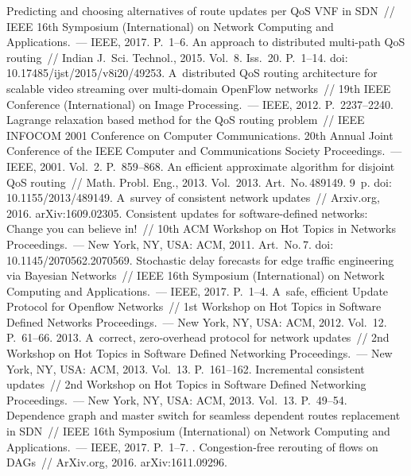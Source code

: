 \begin{multicols}{2}
{{\begin{thebibliography}{99}
 
 Predicting and choosing alternatives 
of route updates per QoS VNF in SDN~// IEEE 16th Symposium (International)
on Network Computing and Applications.~--- IEEE, 2017. P.~1--6.
 An approach to distributed multi-path QoS routing~// 
Indian J.~Sci. Technol., 2015. Vol.~8. Iss.~20. P.~1--14. 
doi: 10.17485/ijst/2015/v8i20/49253.
A~distributed QoS routing architecture for scalable video streaming over multi-domain 
OpenFlow networks~// 19th IEEE Conference (International)
on Image Processing.~--- IEEE, 2012. P.~2237--2240.
Lagrange relaxation based method for the QoS routing problem~// 
IEEE INFOCOM 2001 Conference on Computer Communications. 20th 
Annual Joint Conference of the IEEE Computer and Communications Society
Proceedings.~--- IEEE, 2001. Vol.~2. P.~859--868.
An efficient approximate algorithm for disjoint QoS routing~// 
Math. Probl. Eng., 2013. Vol.~2013. Art.\ No.\,489149. 9~p. 
doi: 10.1155/2013/489149.
A~survey of consistent network updates~// Arxiv.org, 2016. arXiv:1609.02305.
Consistent updates for software-defined networks: Change you can believe in!~// 
10th ACM Workshop on Hot Topics in Networks Proceedings.~--- New York, NY, USA: ACM, 
2011. Art.\ No.\,7. doi: 10.1145/2070562.2070569.
 Stochastic delay forecasts for edge traffic engineering 
via Bayesian Networks~// IEEE 16th Symposium (International)
on Network Computing and Applications.~--- IEEE, 2017. P.~1--4.
 A~safe, efficient Update Protocol for Openflow Networks~// 
1st Workshop on Hot Topics in Software Defined Networks Proceedings.~--- 
New York, NY, USA: ACM, 2012. Vol.~12. P.~61--66.
 2013. A~correct, zero-overhead protocol for network updates~// 
2nd Workshop on Hot Topics in Software Defined Networking Proceedings.~--- 
New York, NY, USA: ACM, 2013. Vol.~13. P.~161--162.
 Incremental consistent updates~// 
2nd Workshop on Hot Topics in Software Defined Networking Proceedings.~--- 
New York, NY, USA: ACM, 2013. Vol.~13. P.~49--54.
 Dependence graph and master switch for seamless dependent 
 routes replacement in SDN~// IEEE 16th Symposium 
 (International) on Network Computing and Applications.~--- IEEE, 2017. P.~1--7.
.
 Congestion-free rerouting of flows
on DAGs~// ArXiv.org, 2016. arXiv:1611.09296.


\end{thebibliography}}}
\end{multicols}
